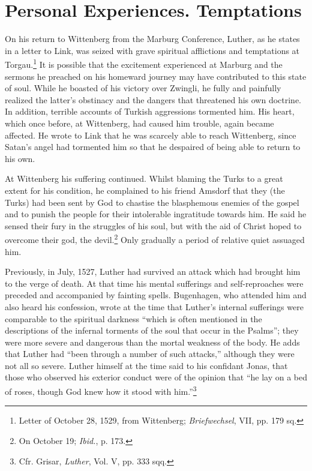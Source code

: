 \section{Personal Experiences. Temptations}

On his return to Wittenberg from the Marburg Conference, Luther,
as he states in a letter to Link, was seized with grave spiritual afflictions
and temptations at Torgau.\footnote
{Letter of October 28, 1529, from Wittenberg; \textit{Briefwechsel}, VII, pp. 179 sq.}
 It is possible that the excitement experienced
at Marburg and the sermons he preached on his homeward
journey may have contributed to this state of soul. While he boasted
of his victory over Zwingli, he fully and painfully realized the latter’s
obstinacy and the dangers that threatened his own doctrine. In addition,
terrible accounts of Turkish aggressions tormented him. His
heart, which once before, at Wittenberg, had caused him trouble, again
became affected. He wrote to Link that he was scarcely able to reach
Wittenberg, since Satan’s angel had tormented him so that he despaired
of being able to return to his own.

At Wittenberg his suffering continued. Whilst blaming the Turks
to a great extent for his condition, he complained to his friend
Amsdorf that they (the Turks) had been sent by God to chastise
the blasphemous enemies of the gospel and to punish the people
for their intolerable ingratitude towards him. He said he sensed their
fury in the struggles of his soul, but with the aid of Christ hoped to
overcome their god, the devil.\footnote{On October 19; \textit{Ibid.}, p. 173.}
Only gradually a period of relative quiet assuaged him.

Previously, in July, 1527, Luther had survived an attack which
had brought him to the verge of death. At that time his mental
sufferings and self-reproaches were preceded and accompanied by
fainting spells. Bugenhagen, who attended him and also heard his
confession, wrote at the time that Luther’s internal sufferings were
comparable to the spiritual darkness “which is often mentioned in the
descriptions of the infernal torments of the soul that occur in the
Psalms”; they were more severe and dangerous than the mortal weakness
of the body. He adds that Luther had “been through a number
of such attacks,” although they were not all so severe. Luther himself
at the time said to his confidant Jonas, that those who observed
his exterior conduct were of the opinion that “he lay on a bed of
roses, though God knew how it stood with him.”\footnote{Cfr. Grisar, \textit{Luther}, Vol. V, pp. 333 sqq.}

